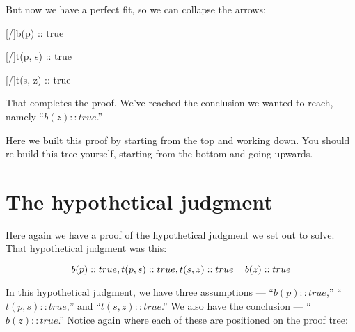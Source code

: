 \documentclass[../../../main.tex]{subfiles}
\begin{document}
\noindent
But now we have a perfect fit, so we can collapse the arrows:


\begin{prooftree*}
  \hypo{}
  [\startrule/]{b(p) :: true}
  
  \hypo{}
  [\startrule/]{t(p, s) :: true}

    
  \hypo{}
  [\startrule/]{t(s, z) :: true}

  
\end{prooftree*}

\noindent
That completes the proof. We've reached the conclusion we wanted to reach, namely ``$b(z) :: true$.'' 

Here we built this proof by starting from the top and working down. You should re-build this tree yourself, starting from the bottom and going upwards. 


\section{The hypothetical judgment}

Here again we have a proof of the hypothetical judgment we set out to solve. That hypothetical judgment was this:

\begin{equation*}
  b(p) :: true, t(p, s) :: true, t(s, z) :: true \ndturnstile/ b(z) :: true
\end{equation*}

\noindent
In this hypothetical judgment, we have three assumptions --- ``$b(p) :: true$,'' ``$t(p, s) :: true$,'' and ``$t(s, z) :: true$.'' We also have the conclusion --- ``$b(z) :: true$.'' Notice again where each of these are positioned on the proof tree:
\end{document}
